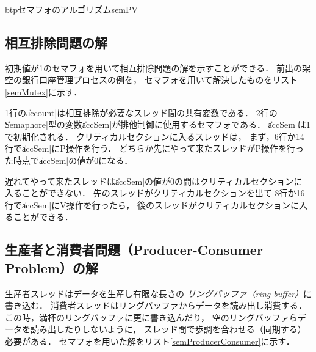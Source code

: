 \begin{myfig}{btp}{セマフォのアルゴリズム}{semPV}
  \small\begin{center}
  \begin{minipage}{0.48\columnwidth}
    
    \label{fig:semP}
  \end{minipage}\hspace{1em}
  \begin{minipage}{0.48\columnwidth}
    
    \label{fig:semV}
  \end{minipage}
  \end{center}
\end{myfig}

\subsection{相互排除問題の解}
初期値が1のセマフォを用いて相互排除問題の解を示すことができる．
前出の架空の銀行口座管理プロセスの例を，
セマフォを用いて解決したものをリスト\ref{semMutex}に示す．



1行の\|account|は相互排除が必要なスレッド間の共有変数である．
2行の\|Semaphore|型の変数\|accSem|が排他制御に使用するセマフォである．
\|accSem|は1で初期化される．
クリティカルセクションに入るスレッドは，
まず，6行か14行で\|accSem|にP操作を行う．
どちらか先にやって来たスレッドがP操作を行った時点で\|accSem|の値が0になる．

遅れてやって来たスレッドは\|accSem|の値が0の間はクリティカルセクションに
入ることができない．
先のスレッドがクリティカルセクションを出て
8行か16行で\|accSem|にV操作を行ったら，
後のスレッドがクリティカルセクションに入ることができる．

\subsection{生産者と消費者問題（Producer-Consumer Problem）の解}
生産者スレッドはデータを生産し有限な長さの
\emph{リングバッファ（ring buffer）}に書き込む．
消費者スレッドはリングバッファからデータを読み出し消費する．
この時，満杯のリングバッファに更に書き込んだり，
空のリングバッファらデータを読み出したりしないように，
スレッド間で歩調を合わせる（同期する）必要がある．
セマフォを用いた解をリスト\ref{semProducerConsumer}に示す．

